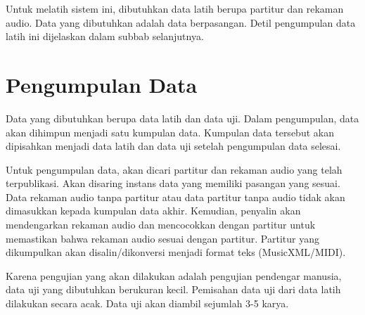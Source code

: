 Untuk melatih sistem ini, dibutuhkan data latih berupa partitur dan rekaman audio. Data yang dibutuhkan adalah data berpasangan. Detil pengumpulan data latih ini dijelaskan dalam subbab selanjutnya.

\section{Pengumpulan Data}

Data yang dibutuhkan berupa data latih dan data uji. Dalam pengumpulan, data akan dihimpun menjadi satu kumpulan data. Kumpulan data tersebut akan dipisahkan menjadi data latih dan data uji setelah pengumpulan data selesai.

Untuk pengumpulan data, akan dicari partitur dan rekaman audio yang telah terpublikasi. Akan disaring instans data yang memiliki pasangan yang sesuai. Data rekaman audio tanpa partitur atau data partitur tanpa audio tidak akan dimasukkan kepada kumpulan data akhir. Kemudian, penyalin akan mendengarkan rekaman audio dan mencocokkan dengan partitur untuk memastikan bahwa rekaman audio sesuai dengan partitur. Partitur yang dikumpulkan akan disalin/dikonversi menjadi format teks (MusicXML/MIDI).

Karena pengujian yang akan dilakukan adalah pengujian pendengar manusia, data uji yang dibutuhkan berukuran kecil. Pemisahan data uji dari data latih dilakukan secara acak. Data uji akan diambil sejumlah 3-5 karya.